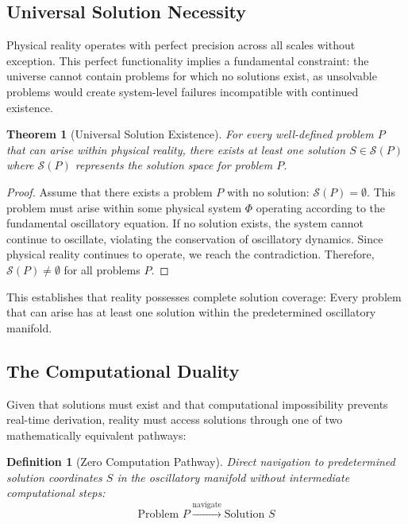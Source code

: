 \documentclass[12pt,a4paper]{article}
\newtheorem{theorem}{Theorem}
\newtheorem{definition}{Definition}
\begin{document}
\subsection{Universal Solution Necessity}

Physical reality operates with perfect precision across all scales without exception. This perfect functionality implies a fundamental constraint: the universe cannot contain problems for which no solutions exist, as unsolvable problems would create system-level failures incompatible with continued existence.

\begin{theorem}[Universal Solution Existence]
For every well-defined problem $P$ that can arise within physical reality, there exists at least one solution $S \in \mathcal{S}(P)$ where $\mathcal{S}(P)$ represents the solution space for problem $P$.
\end{theorem}

\begin{proof}
Assume that there exists a problem $P$ with no solution: $\mathcal{S}(P) = \emptyset$. This problem must arise within some physical system $\Phi$ operating according to the fundamental oscillatory equation. If no solution exists, the system cannot continue to oscillate, violating the conservation of oscillatory dynamics. Since physical reality continues to operate, we reach the contradiction. Therefore, $\mathcal{S}(P) \neq \emptyset$ for all problems $P$.
\end{proof}

This establishes that reality possesses complete solution coverage: Every problem that can arise has at least one solution within the predetermined oscillatory manifold.

\subsection{The Computational Duality}

Given that solutions must exist and that computational impossibility prevents real-time derivation, reality must access solutions through one of two mathematically equivalent pathways:

\begin{definition}[Zero Computation Pathway]
Direct navigation to predetermined solution coordinates $S$ in the oscillatory manifold without intermediate computational steps:
$$\text{Problem } P \xrightarrow{\text{navigate}} \text{Solution } S$$
\end{definition}
\end{document}
